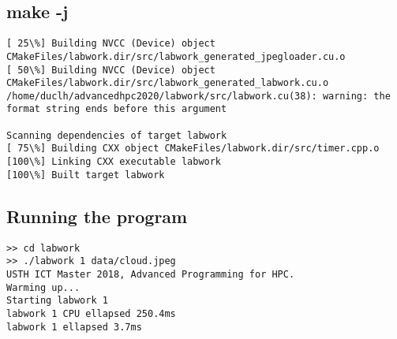 \documentclass{article}
\begin{document}
\subsection{make -j}
\scriptsize
\begin{verbatim}
[ 25\%] Building NVCC (Device) object CMakeFiles/labwork.dir/src/labwork_generated_jpegloader.cu.o
[ 50\%] Building NVCC (Device) object CMakeFiles/labwork.dir/src/labwork_generated_labwork.cu.o
/home/duclh/advancedhpc2020/labwork/src/labwork.cu(38): warning: the format string ends before this argument

Scanning dependencies of target labwork
[ 75\%] Building CXX object CMakeFiles/labwork.dir/src/timer.cpp.o
[100\%] Linking CXX executable labwork
[100\%] Built target labwork
\end{verbatim}

\subsection{Running the program}
\small
\begin{verbatim}
>> cd labwork
>> ./labwork 1 data/cloud.jpeg
USTH ICT Master 2018, Advanced Programming for HPC.
Warming up...
Starting labwork 1
labwork 1 CPU ellapsed 250.4ms
labwork 1 ellapsed 3.7ms

\end{verbatim}
\end{document}
